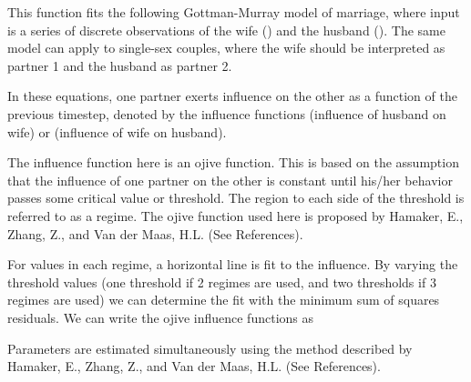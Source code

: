 \documentclass[a4paper]{book}
\begin{document}
\begin{Details}\relax
This function fits the following Gottman-Murray model of marriage,
where input is a series of discrete observations of the  wife ()
and the husband (). The same model can apply to single-sex couples,
where the wife should be interpreted as partner 1 and the husband as
partner 2. 



In these equations, one partner exerts influence on the other as a
function of the previous timestep, denoted by the influence functions
 (influence of husband on wife) or  (influence
of wife on husband). 

The influence function here is an ojive function. This is based on the
assumption that the influence of one partner on the other is constant
until his/her behavior passes some critical value or threshold. The
region to each side of the threshold is referred to as a regime. The
ojive function used here is proposed by Hamaker, E., Zhang, Z., and
Van der Maas, H.L. (See References). 

For values in each regime, a horizontal line is fit to the influence.
By varying the
threshold values (one threshold if 2 regimes are used, and two
thresholds if 3 regimes are used) we can determine the fit with the
minimum sum of squares residuals. We can write the ojive influence
functions as 


Parameters are estimated simultaneously using the method described by
Hamaker, E., Zhang, Z., and Van der Maas, H.L. (See References).
\end{Details}
\end{document}
